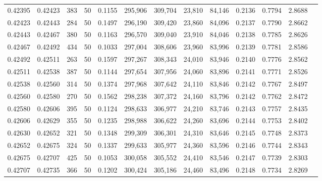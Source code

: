 \begin{tabular}{rrrrrrrrrrrrr}
0.42395 & 0.42423 &   383 &  50 &                                     0.1155 & 295,906 & 309,704 &  23,810 &  84,146 & 0.2136 & 0.7794 & 2.8688 \\
0.42423 & 0.42443 &   284 &  50 &                                     0.1497 & 296,190 & 309,420 &  23,860 &  84,096 & 0.2137 & 0.7790 & 2.8662 \\
0.42443 & 0.42467 &   380 &  50 &                                     0.1163 & 296,570 & 309,040 &  23,910 &  84,046 & 0.2138 & 0.7785 & 2.8626 \\
0.42467 & 0.42492 &   434 &  50 &                                     0.1033 & 297,004 & 308,606 &  23,960 &  83,996 & 0.2139 & 0.7781 & 2.8586 \\
0.42492 & 0.42511 &   263 &  50 &                                     0.1597 & 297,267 & 308,343 &  24,010 &  83,946 & 0.2140 & 0.7776 & 2.8562 \\
0.42511 & 0.42538 &   387 &  50 &                                     0.1144 & 297,654 & 307,956 &  24,060 &  83,896 & 0.2141 & 0.7771 & 2.8526 \\
0.42538 & 0.42560 &   314 &  50 &                                     0.1374 & 297,968 & 307,642 &  24,110 &  83,846 & 0.2142 & 0.7767 & 2.8497 \\
0.42560 & 0.42580 &   270 &  50 &                                     0.1562 & 298,238 & 307,372 &  24,160 &  83,796 & 0.2142 & 0.7762 & 2.8472 \\
0.42580 & 0.42606 &   395 &  50 &                                     0.1124 & 298,633 & 306,977 &  24,210 &  83,746 & 0.2143 & 0.7757 & 2.8435 \\
0.42606 & 0.42629 &   355 &  50 &                                     0.1235 & 298,988 & 306,622 &  24,260 &  83,696 & 0.2144 & 0.7753 & 2.8402 \\
0.42630 & 0.42652 &   321 &  50 &                                     0.1348 & 299,309 & 306,301 &  24,310 &  83,646 & 0.2145 & 0.7748 & 2.8373 \\
0.42652 & 0.42675 &   324 &  50 &                                     0.1337 & 299,633 & 305,977 &  24,360 &  83,596 & 0.2146 & 0.7744 & 2.8343 \\
0.42675 & 0.42707 &   425 &  50 &                                     0.1053 & 300,058 & 305,552 &  24,410 &  83,546 & 0.2147 & 0.7739 & 2.8303 \\
0.42707 & 0.42735 &   366 &  50 &                                     0.1202 & 300,424 & 305,186 &  24,460 &  83,496 & 0.2148 & 0.7734 & 2.8269 \\

\end{tabular}
